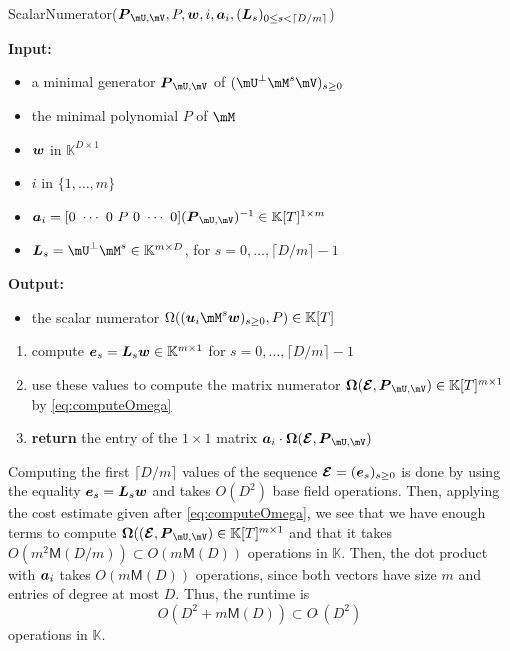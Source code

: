 \documentclass[12pt]{article}
\newcommand{\mat}[1]{\bm{\MakeUppercase{#1}}} %
\newcommand{\row}[1]{\bm{\MakeLowercase{#1}}} %
\newcommand{\col}[1]{\bm{\MakeLowercase{#1}}} %
\newcommand{\softO}[1]{O{\tilde{~}}(#1)} %
\newcommand{\minpoly}{P}
\def\M {\ensuremath{\mathsf{M}}}
\def\K{\mathbb{K}}
\def\K {\ensuremath{\mathbb{K}}}
\begin{document}
\begin{algorithm}[H]
	\caption{{\sf ScalarNumerator}($\mat{P}_{\mU,\mV}, \minpoly, \row{w}, i, \row{a}_i,(\mat{L}_s)_{0 \le s < \lceil D/m\rceil}$)}
	{\bf Input:} \vspace{-0.5em}
	\begin{itemize}
		\item a minimal generator $\mat{P}_{\mU,\mV}$ of $(\mU^\perp \mM^s \mV)_{s \ge 0}$
    \item the minimal polynomial $P$ of $\mM$
    \item $\row{w}$ in $\K^{D \times 1}$
    \item $i$ in $\{1,\dots,m\}$
    \item $\row{a}_i =  [0~\cdots~0~\minpoly~0~\cdots~0]  (\mat{P}_{\mU,\mV})^{-1} \in \K[T]^{1\times m}$
		\item $\mat{L}_s = \mU^\perp \mM^s \in \K^{m\times D}$, for $s=0,\dots,\lceil D/m\rceil-1$
	\end{itemize}
	{\bf Output:}  \vspace{-0.5em}
        \begin{itemize}
        \item         the scalar numerator $\Omega((\row{u}_i \mM^s \col{w})_{s \ge 0}, \minpoly) \in \K[T]$
        \end{itemize}
        \begin{enumerate}
        \item compute $\col{E}_s = \mat{L}_s \col{w} \in \K^{m \times 1}$ for $s=0,\dots,\lceil D/m\rceil-1$
        \item use these values to compute the matrix numerator $ \mat{\Omega}(\mat{\mathcal{E}}, \mat{P}_{\mU,\mV}) \in \K[T]^{m \times 1}$ 
          by \cref{eq:computeOmega}
        \item {\bf return} the entry of the $1 \times 1$ matrix $\row{a}_i\cdot  \mat{\Omega}(\mat{\mathcal{E}}, \mat{P}_{\mU,\mV})$ 
        \end{enumerate}
	\label{algo:scalar_numerator}
\end{algorithm}

Computing the first $\lceil D/m \rceil$ values of the sequence
$\mat{\mathcal{E}}=(\col{e}_s)_{s \ge 0}$ is done by using the
equality $\col{E}_s = \mat{L}_s \col{w}$ and takes $O(D^2)$ base field
operations. Then, applying the cost estimate given after
\cref{eq:computeOmega}, we see that we have enough terms to compute
$\mat{\Omega}( (\mat{\mathcal{E}}, \mat{P}_{\mU,\mV}) \in \K[T]^{m
\times 1}$ and that it takes $O(m^2 \M(D/m)) \subset O(m \M(D))$ operations in
$\K$. Then, the dot product with $\row{a}_i$ takes $O(m \M(D))$
operations, since both vectors have size $m$ and entries of degree at
most $D$. Thus, the runtime is 
$$O(D^2 + m \M(D)) \subset \softO{D^2}$$
operations in $\K$.
\end{document}
